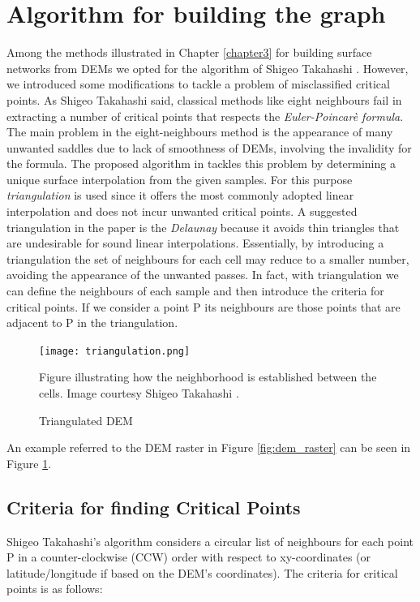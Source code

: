 \section{Algorithm for building the graph}
Among the methods illustrated in Chapter \ref{chapter3} for building surface networks from DEMs we opted for the algorithm of Shigeo Takahashi \cite{extracting_surface_topology}. However, we introduced some modifications to tackle a problem of misclassified critical points.
As Shigeo Takahashi said, classical methods like eight neighbours fail in extracting a number of critical points that respects the \textit{Euler-Poincarè formula}. The main problem in the eight-neighbours method is the appearance of many unwanted saddles due to lack of smoothness of DEMs, involving the invalidity for the formula. The proposed algorithm in \cite{extracting_surface_topology} tackles this problem by determining a unique surface interpolation from the given samples. For this purpose  \textit{triangulation} is used since it offers the most commonly adopted linear interpolation and does not incur unwanted critical points. A suggested triangulation in the paper is the \textit{Delaunay} because it avoids thin triangles that are undesirable for sound linear interpolations. Essentially, by introducing a triangulation the set of neighbours for each cell may reduce to a smaller number, avoiding the appearance of the unwanted passes. In fact, with triangulation we can define the neighbours of each sample and then introduce the criteria for critical points. If we consider a point P its neighbours are those points that are adjacent to P in the triangulation.
\begin{figure} 
\centering
\texttt{[image: triangulation.png]}
\caption{Triangulated DEM}
Figure illustrating how the neighborhood is established between the cells. Image courtesy Shigeo Takahashi \cite{extracting_surface_topology}.
\label{fig:triangulation}
\end{figure}
An example referred to the DEM raster in Figure \ref{fig:dem_raster} can be seen in Figure \ref{fig:triangulation}. 
\subsection{Criteria for finding Critical Points}
Shigeo Takahashi's algorithm considers a circular list of neighbours for each point P in a counter-clockwise (CCW) order with respect to xy-coordinates (or latitude/longitude if based on the DEM's coordinates). The criteria for critical points is as follows:

